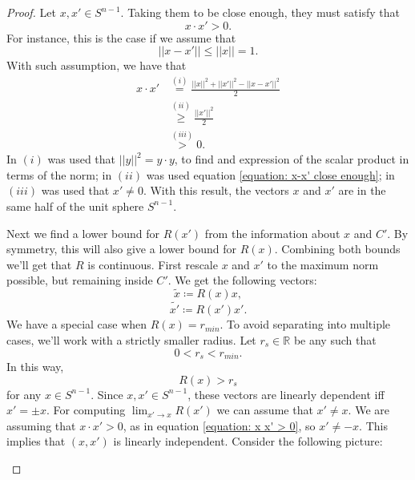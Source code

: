 \documentclass[10pt,a4paper]{amsart}
\newcommand{\realNumbers}{\mathbb{R}}
\begin{document}
\begin{proof}
	Let $x, x' \in S^{n-1}$. Taking them to be close enough, they must satisfy that
	\begin{equation}
		\label{equation: x x' > 0}
		x \cdot x' > 0.
	\end{equation}
	For instance, this is the case if we assume that
	\begin{equation}
		\label{equation: x-x' close enough}
		||x-x'|| \leq ||x|| = 1.
	\end{equation}
	With such assumption, we have that
	\begin{align*}
		x \cdot x' &\stackrel{(i)}{=} \frac{||x||^2 +||x'||^2 -||x-x'||^2}{2} \\
		&\stackrel{(ii)}{\geq} \frac{||x'||^2}{2} \\
		&\stackrel{(iii)}{>} 0.
	\end{align*}
	In $(i)$ was used that $||y||^2 = y \cdot y$, to find and expression of the scalar product in terms of the norm; in $(ii)$ was used equation \ref{equation: x-x' close enough}; in $(iii)$ was used that $x' \neq 0$. With this result, the vectors $x$ and $x'$ are in the same half of the unit sphere $S^{n-1}$.
	
	Next we find a lower bound for $R(x')$ from the information about $x$ and $C'$. By symmetry, this will also give a lower bound for $R(x)$. Combining both bounds we'll get that $R$ is continuous. First rescale $x$ and $x'$ to the maximum norm possible, but remaining inside $C'$. We get the following vectors:
	\begin{equation}
		\widetilde{x} \coloneqq R(x) x,
	\end{equation}
	\begin{equation}
		\widetilde{x'} \coloneqq R(x') x'.
	\end{equation}
	We have a special case when $R(x) = r_{min}$. To avoid separating into multiple cases, we'll work with a strictly smaller radius. Let $r_s \in \realNumbers$ be any such that
	\begin{equation}
		0 < r_s < r_{min}.
	\end{equation}
	In this way,
	\begin{equation}
		R(x) > r_s
	\end{equation}
	for any $x \in S^{n-1}$. Since $x, x' \in S^{n-1}$, these vectors are linearly dependent iff $x' = \pm x$. For computing $\lim_{x' \to x} R(x')$ we can assume that $x' \neq x$. We are assuming that $x \cdot x' > 0$, as in equation \ref{equation: x x' > 0}, so $x' \neq -x$. This implies that $(x,x')$ is linearly independent. Consider the following picture:
	\begin{center}
		\begin{tikzpicture}[x=0.75pt,y=0.75pt,yscale=-1,xscale=1]
			

\end{tikzpicture}
\end{center}
\end{proof}
\end{document}
